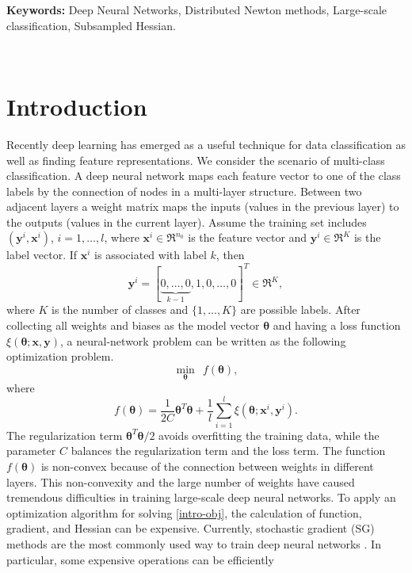 \documentclass[12pt]{article}
\def\bx{{\boldsymbol x}}
\def\by{{\boldsymbol y}}
\def\btheta{\boldsymbol \theta}
\begin{document}
{\bf Keywords:} Deep Neural Networks, Distributed Newton methods, Large-scale classification, Subsampled Hessian.
\ \vspace{-0mm}\\

\section{Introduction}
\label{sec:Introduction}
Recently deep learning has emerged as a useful technique for data classification as well as finding feature representations.
We consider the scenario of multi-class classification. A deep neural network maps each feature vector to one of the class labels by the connection of nodes
in a multi-layer structure. Between two adjacent layers a weight matrix maps the inputs (values in the previous layer) to the outputs (values in the current layer).
Assume the training set includes $(\by^i,\bx^i)$, $i=1,\ldots,l$, where $\bx^i \in \Re^{n_0}$ is the feature vector and $\by^i \in \Re^K$ is the label vector. If $\bx^i$ is associated with label $k$, then
\begin{equation*}
    \by^i = [\underbrace{0,\ldots,0}_{k-1},1,0,\ldots,0]^T \in \Re^K,
\end{equation*}
where $K$ is the number of classes and $\{1,\ldots,K\}$ are possible labels.
After collecting all weights and biases as the model vector $\btheta$ and having a loss function $\xi(\btheta; \bx, \by)$, a neural-network problem can be written as the following optimization problem. 
\begin{equation}
\label{intro-obj}
	\min_{\btheta}\ \ f(\btheta), 
\end{equation}
where
\begin{equation}
\label{intro-obj}
f(\btheta) = \frac{1}{2C} \btheta^T\btheta + \frac{1}{l}\sum_{i=1}^l \xi(\btheta;\bx^i,\by^i).
\end{equation}
The regularization term $\btheta^T\btheta/2$ avoids overfitting the training data, while the parameter $C$ balances the regularization term and the loss term.
The function $f(\btheta)$ is non-convex because of the connection between weights in different layers. This non-convexity and the large number of weights have caused 
tremendous difficulties in training large-scale deep neural networks.
To apply an optimization algorithm for solving \eqref{intro-obj}, the calculation of function, gradient, and Hessian can be expensive. Currently,
stochastic gradient (SG) methods are the most commonly used way to train deep neural networks \citep[e.g.,][]{LB91a,YL98b,LB10a,MZ10a,JD12a,PM15a}. In particular, some expensive operations can be efficiently
\end{document}
